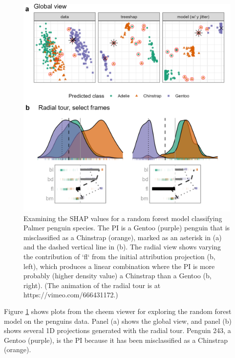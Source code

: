 \documentclass[
]{jss}
\begin{document}
\begin{CodeChunk}
\begin{figure}

{\centering \includegraphics[width=1\linewidth]{./figures/case_penguins} 

}

\caption[Examining the SHAP values for a random forest model classifying Palmer penguin species]{Examining the SHAP values for a random forest model classifying Palmer penguin species. The PI is a Gentoo (purple) penguin that is misclassified as a Chinstrap (orange), marked as an asterisk in (a) and the dashed vertical line in (b). The radial view shows varying the contribution of `fl` from the initial attribution projection (b, left), which produces a linear combination where the PI is more probably (higher density value) a Chinstrap than a Gentoo (b, right). (The animation of the radial tour is at https://vimeo.com/666431172.)}\label{fig:casepenguins}
\end{figure}
\end{CodeChunk}

Figure \ref{fig:casepenguins} shows plots from the cheem viewer for
exploring the random forest model on the penguins data. Panel (a) shows
the global view, and panel (b) shows several 1D projections generated
with the radial tour. Penguin 243, a Gentoo (purple), is the PI because
it has been misclassified as a Chinstrap (orange).
\end{document}
